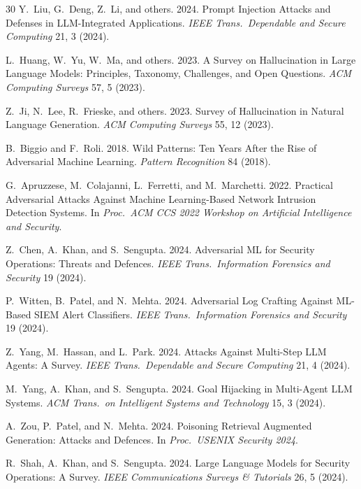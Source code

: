 \documentclass[sigconf,nonacm]{acmart}
\begin{document}
\begin{thebibliography}{30}
Y.~Liu, G.~Deng, Z.~Li, and others. 2024. Prompt Injection Attacks
and Defenses in LLM-Integrated Applications.
\textit{IEEE Trans.\ Dependable and Secure Computing} 21, 3 (2024).

L.~Huang, W.~Yu, W.~Ma, and others. 2023. A Survey on
Hallucination in Large Language Models: Principles, Taxonomy,
Challenges, and Open Questions.
\textit{ACM Computing Surveys} 57, 5 (2023).

Z.~Ji, N.~Lee, R.~Frieske, and others. 2023. Survey of
Hallucination in Natural Language Generation.
\textit{ACM Computing Surveys} 55, 12 (2023).

B.~Biggio and F.~Roli. 2018. Wild Patterns: Ten Years After the
Rise of Adversarial Machine Learning.
\textit{Pattern Recognition} 84 (2018).

G.~Apruzzese, M.~Colajanni, L.~Ferretti, and M.~Marchetti. 2022.
Practical Adversarial Attacks Against Machine Learning-Based
Network Intrusion Detection Systems. In \textit{Proc.\ ACM CCS
2022 Workshop on Artificial Intelligence and Security}.

Z.~Chen, A.~Khan, and S.~Sengupta. 2024. Adversarial ML for
Security Operations: Threats and Defences.
\textit{IEEE Trans.\ Information Forensics and Security} 19 (2024).

P.~Witten, B.~Patel, and N.~Mehta. 2024. Adversarial Log
Crafting Against ML-Based SIEM Alert Classifiers.
\textit{IEEE Trans.\ Information Forensics and Security} 19 (2024).

Z.~Yang, M.~Hassan, and L.~Park. 2024. Attacks Against Multi-Step
LLM Agents: A Survey.
\textit{IEEE Trans.\ Dependable and Secure Computing} 21, 4 (2024).

M.~Yang, A.~Khan, and S.~Sengupta. 2024. Goal Hijacking in
Multi-Agent LLM Systems.
\textit{ACM Trans.\ on Intelligent Systems and Technology} 15, 3
(2024).

A.~Zou, P.~Patel, and N.~Mehta. 2024. Poisoning Retrieval
Augmented Generation: Attacks and Defences.
In \textit{Proc.\ USENIX Security 2024}.

R.~Shah, A.~Khan, and S.~Sengupta. 2024. Large Language Models
for Security Operations: A Survey.
\textit{IEEE Communications Surveys \& Tutorials} 26, 5 (2024).


\end{thebibliography}
\end{document}
